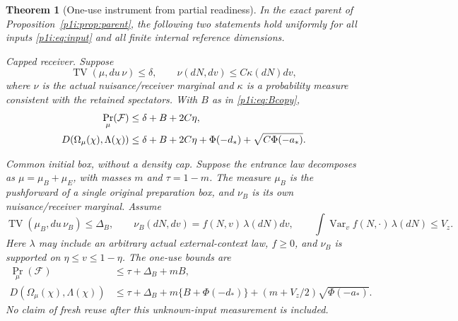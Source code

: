 \documentclass[11pt]{article}
\numberwithin{equation}{section}
\newtheorem{theorem}{Theorem}[section]
\theoremstyle{definition}
\theoremstyle{remark}
\begin{document}
\begin{theorem}[One-use instrument from partial readiness]
\label{p1i:thm:instrument}
In the exact parent of Proposition~\ref{p1i:prop:parent}, the following
two statements hold uniformly for all inputs \eqref{p1i:eq:input} and all
finite internal reference dimensions.

\emph{Capped receiver.} Suppose
\[
 \operatorname{TV}(\mu,du\,\nu)\leq\delta,
 \qquad \nu(dN,dv)\leq C\kappa(dN)dv,
\]
where $\nu$ is the actual nuisance/receiver marginal and $\kappa$ is a
probability measure consistent with the retained spectators. With $B$ as
in \eqref{p1i:eq:Bcopy},
\begin{align}
 \Pr_\mu(\mathcal F)&\leq\delta+B+2C\eta,\notag\\
 D(\Omega_\mu(\chi),\Lambda(\chi))
 &\leq\delta+B+2C\eta+\Phi(-d_*)
                         +\sqrt{C\Phi(-a_*)}.\label{p1i:eq:capinstrument}
\end{align}

\emph{Common initial box, without a density cap.} Suppose the entrance
law decomposes as $\mu=\mu_B+\mu_E$, with masses $m$ and $\tau=1-m$.
The measure $\mu_B$ is the pushforward of a single original preparation
box, and $\nu_B$ is its own nuisance/receiver marginal. Assume
\begin{equation}\label{p1i:eq:boxpremises}
 \operatorname{TV}(\mu_B,du\,\nu_B)\leq\Delta_B,
 \qquad\nu_B(dN,dv)=f(N,v)\,\lambda(dN)dv,
 \qquad\int\operatorname{Var}_v f(N,\cdot)\,\lambda(dN)\leq V_z.
\end{equation}
Here $\lambda$ may include an arbitrary actual external-context law,
$f\geq0$, and $\nu_B$ is supported on $\eta\leq v\leq1-\eta$.
The one-use bounds are
\begin{align}
 \Pr_\mu(\mathcal F)&\leq\tau+\Delta_B+mB,\label{p1i:eq:boxhistory}\\
 D(\Omega_\mu(\chi),\Lambda(\chi))
 &\leq\tau+\Delta_B+m\{B+\Phi(-d_*)\}
       +(m+V_z/2)\sqrt{\Phi(-a_*)}.\label{p1i:eq:boxinstrument}
\end{align}
No claim of fresh reuse after this unknown-input measurement is included.
\end{theorem}
\end{document}
